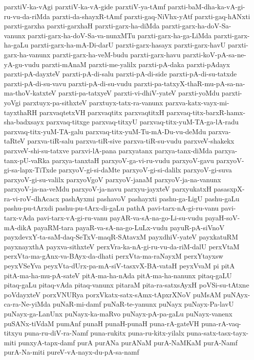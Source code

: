 {parxtiV-ka-vAgi
parxtiV-ka-vA-gide
parxtiV-ya-tAmf
parxti-baM-dha-ka-vA-gi-ru-vu-da-riMda
parxti-da-shayxR-tAmf
parxti-gaq-NiVhx-yAtf
parxti-gaq-hANxti
parxti-garxha
parxti-garxhaH
parxti-garx-ha-diMda
parxti-garx-ha-doV-Sa-vanunx
parxti-garx-ha-doV-Sa-va-nunxMTu
parxti-garx-ha-ga-LiMda
parxti-garx-ha-gaLu
parxti-garx-ha-mA-Di-darU
parxti-garx-hasayx
parxti-garx-havU
parxti-garx-ha-vanunx
parxti-garx-ha-veM-budu
parxti-garx-havu
parxti-koV-pA-sa-ne-yA-gu-vudu
parxti-mAnaM
parxti-me-yalilx
parxti-pA-daka
parxti-pAdayx
parxti-pA-dayxteV
parxti-pA-di-salu
parxti-pA-di-side
parxti-pA-di-su-tatxde
parxti-pA-di-su-vavu
parxti-pA-di-su-vudu
parxti-pa-tatxyX-thaR-mu-pA-sa-na-ma-thoV-katxteV
parxti-pa-tatxyeV
parxti-vi-dhiV-yateV
parxti-yoMdu
parxti-yoVgi
parxtuyx-pa-sithxteV
parxtuyx-tatx-ra-vanunx
parxva-katx-vayx-mi-tayxthaRH
parxvaqtetxVH
parxvaqtitx
parxvaqtitxH
parxvaq-titx-barxR-hamx-sha-badxsayx
parxvaq-titxge
parxvaq-titxyU
parxvaq-titx-yuM-TA-ga-lA-radu
parxvaq-titx-yuM-TA-galu
parxvaq-titx-yuM-Tu-mA-Du-vu-deMdu
parxva-taRteV
parxva-tiR-salu
parxva-tiR-sive
parxva-tiR-su-vudu
parxveV-shakekx
parxveV-shi-su-tatxve
parxvi-lA-pana
parxyatanx
parxya-tanx-diMda
parxya-tanx-pU-vaRka
parxya-tanxtaH
parxyoV-ga-vi-ru-vudu
parxyoV-gavu
parxyoV-gi-sa-lapx-TiTxde
parxyoV-gi-si-daMte
parxyoV-gi-si-dalilx
parxyoV-gi-suva
parxyoV-gi-su-valilx
parxyoVgoV
parxyoV-janaM
parxyoV-ja-na-vanunx
parxyoV-ja-na-veMdu
parxyoV-ja-navu
parxyu-jayxteV
parxyukatxH
pasasxpX-ra-vi-roV-dhAcacx
pashAyxmi
pashavoV
pashayxti
pashu-ga-LigU
pashu-gaLu
pashu-pu-tArxdi
pashu-pu-tArx-di-gaLu
pathA
pavi-tarx-nA-gi-ru-vanu
pavi-tarx-vAda
pavi-tarx-vA-gi-ru-vanu
payAR-va-sA-na-go-Li-su-vudu
payaH-soV-mA-dikA
payaRM-tara
payaR-va-sA-na-go-LuLx-vudu
payuR-pA-siVnoV
payxdevxY-ta-saM-daq-SeTxV-maqR-SAtavxM
payxdhiV-yateV
payxkatuRM
payxnayxthA
payxva-sithxteV
perxVra-ka-nA-gi-ru-vu-da-riM-dalU
perxVtaM
perxVta-ma-gAnx-va-BAyx-da-dhati
perxVta-ma-raNayxM
perxYtayxsw
peyxVSeYva
peyxVta-dUrx-pa-mA-siV-tasxvX-BA-vataH
peyxVvaM
pi
pitA
pitA-ma-ha-mu-pA-sateV
pitA-ma-ha-nAda
pitA-ma-ha-nanunx
pitaq-gaLU
pitaq-gaLu
pitaq-vAda
pitaq-vanunx
pitaraM
pita-ra-satxsAyxH
poVSi-su-tAtxne
poVdayxteV
porxVNURya
porxVkatx-satx-sAmx-tApxrXNoV
puMsAM
puNAyx-ca-ra-Ne-yiMda
puNaR-mi-damf
puNaR-te-yanunx
puNayx
puNayx-Pa-lavU
puNayx-ga-LanUnx
puNayx-ka-maRvo
puNayx-pA-pa-gaLu
puNayx-vanenx
puSANx-tiVdaM
pumAnf
punaH
punaH-punaH
puna-rA-gateVH
puna-rA-vaq-titxyu
puna-ru-diV-ra-Namf
puna-rukitx
puna-ru-kitx-yilalx
puna-satx-tasx-tayx-miti
punxyA-tapx-damf
purA
purANa
purANaM
purA-NaMKaM
purA-Namf
purA-Na-miti
pureV-vA-nayx-du-pA-sa-namf
}
